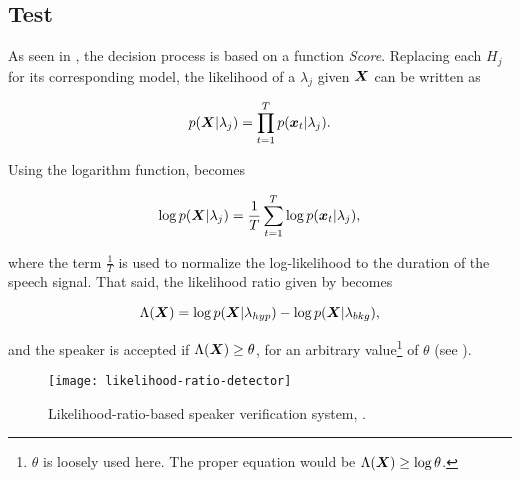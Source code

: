 \subsection{Test}

As seen in , the decision process is based on a function \emph{Score}. Replacing each $H_j$ for its corresponding model, the likelihood of a $\lambda_j$ given $\boldsymbol{X}$ can be written as

\begin{equation}
    p(\dvec{X}|\lambda_j) = \prod_{t=1}^T p(\dvec{x}_t|\lambda_j).
    \label{eq:likelihood-prod}
\end{equation}

\noindent Using the logarithm function,  becomes

\begin{equation}
    \log p(\dvec{X}|\lambda_j) = \frac{1}{T} \sum_{t=1}^T \log p(\dvec{x}_t|\lambda_j),
    \label{eq:log-likelihood-sum}
\end{equation}

\noindent where the term $\frac{1}{T}$ is used to normalize the log-likelihood to the duration of the speech signal. That said, the likelihood ratio given by  becomes

\begin{equation}
    \Lambda(\dvec{X}) = \log p(\dvec{X}|\lambda_{hyp}) - \log p(\dvec{X}|\lambda_{bkg}),
    \label{eq:score_of_X}
\end{equation}

\noindent and the speaker is accepted if $\Lambda(\boldsymbol{X}) \geq \theta$, for an arbitrary value\footnote{$\theta$ is loosely used here. The proper equation would be $\Lambda(\boldsymbol{X}) \geq \log\theta$.} of $\theta$ (see ).

\begin{figure}[ht]
    \centering
    \texttt{[image: likelihood-ratio-detector]}
    \caption{Likelihood-ratio-based speaker verification system, .}
    \label{fig:likelihood_ratio_detector}
\end{figure}